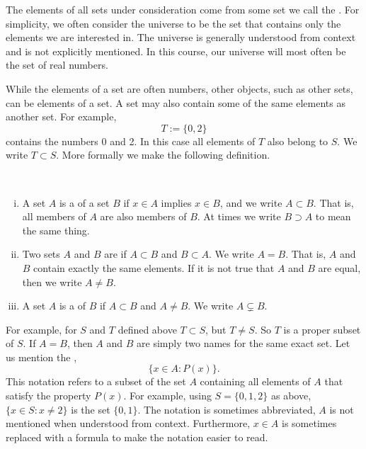 The elements of all sets under consideration come from some set we call the
\emph{}.  For simplicity,
we often consider the universe to be the set that contains only the elements
we are interested in.
The universe is generally understood from context
and is not explicitly mentioned.  In this course, our universe will
most often be the set of real numbers.

While the elements of a set are often numbers,
other objects, such as other sets, can be elements of a set.
A set may also contain some of the same elements as another set.  For example,
\begin{equation*}
T := \{ 0, 2 \}
\end{equation*}
contains the numbers 0 and 2.  In this case all elements of $T$ also
belong to $S$.  We write $T \subset S$.  More formally we make the
following definition.

\begin{defn}
{\ }
\begin{enumerate}[(i)]
\item
A set $A$ is a \emph{}
of a set $B$ if $x \in A$ implies $x \in B$, and we write $A \subset B$.
That is, all members of $A$ are also members of $B$.  At times we
write $B \supset A$ to mean the same thing.
\item
Two sets $A$ and $B$ are \emph{} if $A \subset B$ and $B
\subset A$.  We write $A = B$.
That is, $A$ and $B$ contain exactly the same elements.
If it is not true that $A$ and $B$ are equal, then 
we write $A \not= B$.
\item
A set $A$ is a \emph{} of $B$ if $A \subset B$
and $A \not= B$.  We write $A \subsetneq B$.
\end{enumerate}
\end{defn}

For example, for $S$ and $T$ defined above $T \subset S$, but
$T \not= S$.  So $T$ is a proper subset of $S$.
If $A = B$, then $A$ and $B$ are simply two names for the
same exact set.
Let us mention the
\emph{},
\begin{equation*}
\{ x \in A : P(x) \} .
\end{equation*}
This notation refers to a subset of the set $A$ containing all elements
of $A$ that satisfy the property $P(x)$.
For example, using $S = \{ 0, 1, 2 \}$ as above, $\{ x \in S : x \not= 2 \}$
is the set $\{ 0, 1 \}$.
The notation is sometimes
abbreviated, $A$ is not mentioned when understood from context.
Furthermore, $x \in A$ is sometimes replaced with a formula to make the notation
easier to read.  

